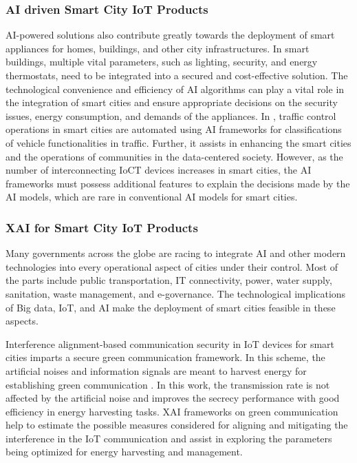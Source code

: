 \documentclass[journal]{IEEEtran}
\begin{document}
\subsubsection{AI driven Smart City IoT Products}
AI-powered solutions also contribute greatly towards the deployment of smart appliances for homes, buildings, and other city infrastructures. In smart buildings, multiple vital parameters, such as lighting, security, and energy thermostats, need to be integrated into a secured and cost-effective solution. The technological convenience and efficiency of AI algorithms can play a vital role in the integration of smart cities and ensure appropriate decisions on the security issues, energy consumption, and demands of the appliances. In \cite{englund2021ai}, traffic control operations in smart cities are automated using AI frameworks for classifications of vehicle functionalities in traffic. Further, it assists in enhancing the smart cities and the operations of communities in the data-centered society. However, as the number of interconnecting IoCT devices increases in smart cities, the AI frameworks must possess additional features to explain the decisions made by the AI models, which are rare in conventional AI models for smart cities.

\subsubsection{XAI for Smart City IoT Products}
Many governments across the globe are racing to integrate AI and other modern technologies into every operational aspect of cities under their control. Most of the parts include public transportation, IT connectivity, power, water supply, sanitation, waste management, and e-governance. The technological implications of Big data, IoT, and AI make the deployment of smart cities feasible in these aspects. 

Interference alignment-based communication security in IoT devices for smart cities imparts a secure green communication framework. In this scheme, the artificial noises and information signals are meant to harvest energy for establishing green communication \cite{xie2020secured}. In this work, the transmission rate is not affected by the artificial noise and improves the secrecy performance with good efficiency in energy harvesting tasks. XAI frameworks on green communication help to estimate the possible measures considered for aligning and mitigating the interference in the IoT communication and assist in exploring the parameters being optimized for energy harvesting and management.
\end{document}
